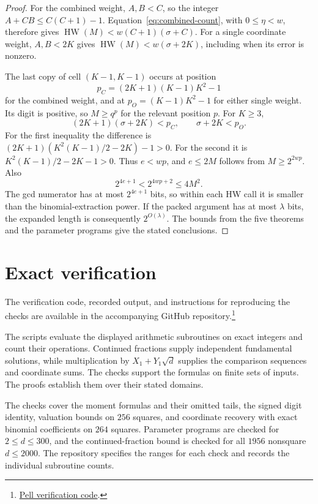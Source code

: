 \documentclass[11pt]{article}
\theoremstyle{remark}
\newcommand{\HW}{\operatorname{HW}}
\begin{document}
\begin{proof}
For the combined weight, $A,B<C$, so the integer
$A+CB\le C(C+1)-1$. Equation~\eqref{eq:combined-count}, with
$0\le\eta<w$, therefore gives $\HW(M)<w(C+1)(\sigma+C)$.
For a single coordinate weight, $A,B<2K$ gives
$\HW(M)<w(\sigma+2K)$, including when its error is nonzero.

The last copy of cell $(K-1,K-1)$ occurs at position
\[
  p_C=(2K+1)(K-1)K^2-1
\]
for the combined weight, and at
$p_O=(K-1)K^2-1$ for either single weight.
Its digit is positive, so $M\ge q^p$ for the relevant position $p$.
For $K\ge3$,
\[
  (2K+1)(\sigma+2K)<p_C,\qquad \sigma+2K<p_O.
\]
For the first inequality the difference is
$(2K+1)(K^2(K-1)/2-2K)-1>0$.
For the second it is $K^2(K-1)/2-2K-1>0$.
Thus $e<wp$, and $e\le2M$ follows from $M\ge2^{2wp}$.
Also
\[
  2^{4e+1}<2^{4wp+2}\le4M^2.
\]
The gcd numerator has at most $2^{4e+1}$ bits, so within each HW
call it is smaller than the binomial-extraction power.
If the packed argument has at most $\lambda$ bits, the expanded
length is consequently $2^{O(\lambda)}$.
The bounds from the five theorems and the parameter programs give
the stated conclusions.
\end{proof}

\section{Exact verification}\label{sec:verification}

The verification code, recorded output, and instructions for reproducing
the checks are available in the accompanying GitHub repository.\footnote{\href{https://github.com/bogdan27182/pell-paper}{Pell verification code}.}

The scripts evaluate the displayed arithmetic subroutines on
exact integers and count their operations. Continued fractions supply
independent fundamental solutions, while multiplication by
$X_1+Y_1\sqrt d$ supplies the comparison sequences and coordinate sums.
The checks support the formulas on finite sets of inputs. The proofs
establish them over their stated domains.

The checks cover the moment formulas and their omitted tails, the signed
digit identity, valuation bounds on $256$ squares, and coordinate recovery
with exact binomial coefficients on $264$ squares. Parameter programs are
checked for $2\le d\le300$, and the continued-fraction bound is checked
for all $1956$ nonsquare $d\le2000$. The repository specifies the ranges for
each check and records the individual subroutine counts.
\end{document}
